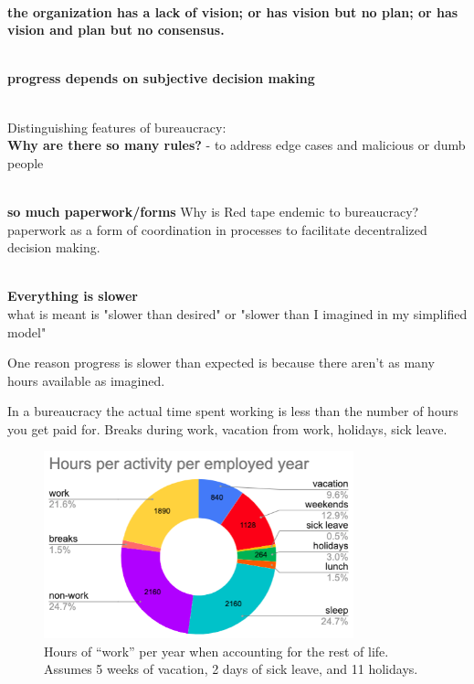 \ \\

\textbf{the organization has a lack of vision; or has vision but no plan; or has vision and plan but no consensus.}

\ \\

\textbf{progress depends on subjective decision making}

\ \\


Distinguishing features of bureaucracy:
\ \\

\textbf{Why are there so many rules?}
- to address edge cases and malicious or dumb people

\ \\

\textbf{so much paperwork/forms}
Why is Red tape endemic to bureaucracy?
paperwork as a form of coordination in processes to facilitate decentralized decision making. 

\ \\

\textbf{Everything is slower}\\
what is meant is "slower than desired" or "slower than I imagined in my simplified model"

One reason progress is slower than expected is because there aren't as many hours available as imagined.



In a bureaucracy the actual time spent working is less than the number of hours you get paid for. Breaks during work, vacation from work, holidays, sick leave. 


\begin{figure}
    \centering
    \includegraphics[width=0.8\textwidth]{images/hours_per_activity_per_employed_year}
    \caption{Hours of ``work'' per year when accounting for the rest of life. Assumes 5 weeks of vacation, 2 days of sick leave, and 11 holidays.}
    \label{fig:hours_per_year}
\end{figure}

